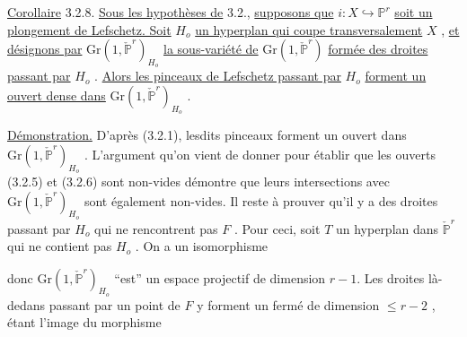 \underline{Corollaire} 3.2.8. \underline{Sous les hypothèses de} 3.2., \underline{supposons que} $i : X \hookrightarrow \mathbb{P}^{r}$ \underline{soit un plongement de Lefschetz. Soit} $H_{o}$ \underline{un hyperplan qui coupe transversalement} $X$ , \underline{et désignons par} $\mathrm{Gr}(1, \check{\mathbb{P}}^{r})_{H_{o}}$ \underline{la sous-variété de} $\mathrm{Gr}(1, \check{\mathbb{P}}^{r})$ \underline{formée des droites passant par} $H_{o}$ . \underline{Alors les pinceaux de Lefschetz passant par} $H_{o}$ \underline{forment un ouvert dense dans} $\mathrm{Gr}(1, \check{\mathbb{P}}^{r})_{H_{o}}$ .

\underline{Démonstration.} D'après (3.2.1), lesdits pinceaux forment un ouvert dans $\mathrm{Gr}(1, \check{\mathbb{P}}^{r})_{H_{o}}$ . L'argument qu'on vient de donner pour
établir que les ouverts (3.2.5) et (3.2.6) sont non-vides démontre que leurs intersections avec $\mathrm{Gr}(1, \check{\mathbb{P}}^{r})_{H_{o}}$ sont également non-vides. Il reste à prouver qu'il y a des droites passant par $H_{o}$ qui ne rencontrent pas $F$ . Pour ceci, soit $T$ un hyperplan dans $\check{\mathbb{P}}^{r}$ qui ne contient pas $H_{o}$ . On a un isomorphisme

\begin{center}
\end{center}
donc $\mathrm{Gr}(1, \check{\mathbb{P}}^{r})_{H_{o}}$ ``est'' un espace projectif de dimension $r-1$. Les droites là-dedans passant par un point de $F$ y forment un fermé de dimension $\leq r-2$ , étant l'image du morphisme

